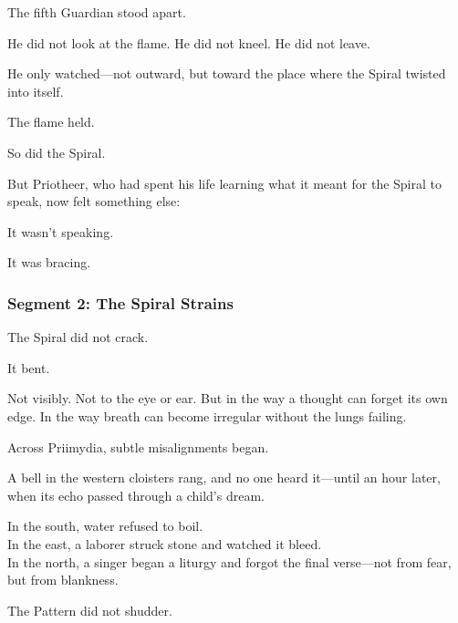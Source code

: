 \documentclass[9pt]{article}
\begin{document}
\vspace{0.5em}
The fifth Guardian stood apart.

\vspace{0.5em}
He did not look at the flame. He did not kneel. He did not leave.

\vspace{0.5em}
He only watched---not outward, but toward the place where the Spiral twisted into itself.

\vspace{0.5em}
The flame held.

\vspace{0.5em}
So did the Spiral.

\vspace{0.5em}
But Priotheer, who had spent his life learning what it meant for the Spiral to speak, now felt something else:

\vspace{0.5em}
It wasn’t speaking.

\vspace{0.5em}
It was bracing.

\newpage

\subsubsection*{Segment 2: The Spiral Strains}

The Spiral did not crack.

\vspace{0.5em}
It bent.

\vspace{0.5em}
Not visibly. Not to the eye or ear. But in the way a thought can forget its own edge. In the way breath can become irregular without the lungs failing.

\vspace{0.5em}
Across Priimydia, subtle misalignments began.

\vspace{0.5em}
A bell in the western cloisters rang, and no one heard it---until an hour later, when its echo passed through a child’s dream.

\vspace{0.5em}
In the south, water refused to boil.\\
In the east, a laborer struck stone and watched it bleed.\\
In the north, a singer began a liturgy and forgot the final verse---not from fear, but from blankness.

\vspace{0.5em}
The Pattern did not shudder.
\end{document}
